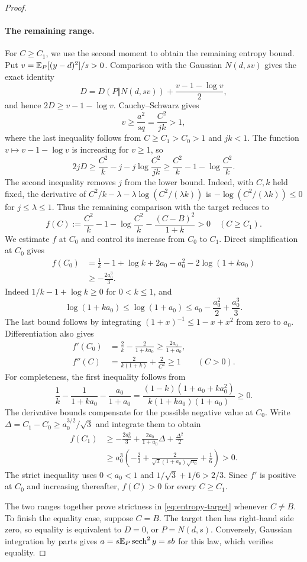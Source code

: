 \begin{proof}
\paragraph{The remaining range.}
For $C\ge C_1$, we use the second moment to obtain the remaining
entropy bound.  Put $v=\mathbb E_P[(y-d)^2]/s>0$.  Comparison with the
Gaussian $N(d,sv)$ gives the exact identity
\[
 D=D(P\Vert N(d,sv))+\frac{v-1-\log v}{2},
\]
and hence $2D\ge v-1-\log v$.  Cauchy--Schwarz gives
\[
 v\ge\frac{a^2}{sq}=\frac{C^2}{jk}>1,
\]
where the last inequality follows from $C\ge C_1>C_0>1$ and $jk<1$.
The function $v\mapsto v-1-\log v$ is increasing for $v\ge1$, so
\[
 2jD\ge \frac{C^2}{k}-j-j\log\frac{C^2}{jk}
       \ge \frac{C^2}{k}-1-\log\frac{C^2}{k}.
\]
The second inequality removes $j$ from the lower bound.  Indeed,
with $C,k$ held fixed, the derivative of
$C^2/k-\lambda-\lambda\log(C^2/(\lambda k))$ is
$-\log(C^2/(\lambda k))\le0$ for $j\le\lambda\le1$.
Thus the remaining comparison with the target reduces to
\[
 f(C):=\frac{C^2}{k}-1-\log\frac{C^2}{k}
       -\frac{(C-B)^2}{1+k}>0
 \quad(C\ge C_1).
\]
We estimate $f$ at $C_0$ and control its increase from $C_0$ to
$C_1$.  Direct simplification at $C_0$ gives
\begin{align*}
 f(C_0)
 &=\frac1k-1+\log k
   +2a_0-a_0^2-2\log(1+ka_0)\\
 &\ge -\frac{2a_0^3}{3}.
\end{align*}
Indeed $1/k-1+\log k\ge0$ for $0<k\le1$, and
\[
 \log(1+ka_0)\le\log(1+a_0)
 \le a_0-\frac{a_0^2}{2}+\frac{a_0^3}{3}.
\]
The last bound follows by integrating
$(1+x)^{-1}\le1-x+x^2$ from zero to $a_0$.  Differentiation also gives
\begin{align*}
 f'(C_0)&=\frac2k-\frac{2}{1+ka_0}
          \ge\frac{2a_0}{1+a_0},\\
 f''(C)&=\frac{2}{k(1+k)}+\frac{2}{C^2}\ge1
          \qquad(C>0).
\end{align*}
For completeness, the first inequality follows from
\[
 \frac1k-\frac1{1+ka_0}-\frac{a_0}{1+a_0}
 =\frac{(1-k)(1+a_0+ka_0^2)}{k(1+ka_0)(1+a_0)}\ge0.
\]
The derivative bounds compensate for the possible negative value
at $C_0$.  Write $\Delta=C_1-C_0\ge a_0^{3/2}/\sqrt3$ and integrate
them to obtain
\begin{align*}
 f(C_1)
 &\ge -\frac{2a_0^3}{3}
       +\frac{2a_0}{1+a_0}\Delta+\frac{\Delta^2}{2}\\
 &\ge a_0^3\left(
       -\frac23+\frac{2}{\sqrt3(1+a_0)\sqrt{a_0}}+\frac16
       \right)>0.
\end{align*}
The strict inequality uses $0<a_0<1$ and
$1/\sqrt3+1/6>2/3$.  Since $f'$ is positive at $C_0$ and increasing
thereafter, $f(C)>0$ for every $C\ge C_1$.

The two ranges together prove strictness in
\eqref{eq:entropy-target} whenever $C\ne B$.  To finish the equality
case, suppose $C=B$.  The target then has right-hand side zero, so
equality is equivalent to $D=0$, or $P=N(d,s)$.  Conversely, Gaussian
integration by parts gives $a=s\mathbb E_P\operatorname{sech}^2 y=sb$ for this law,
which verifies equality.
\end{proof}

